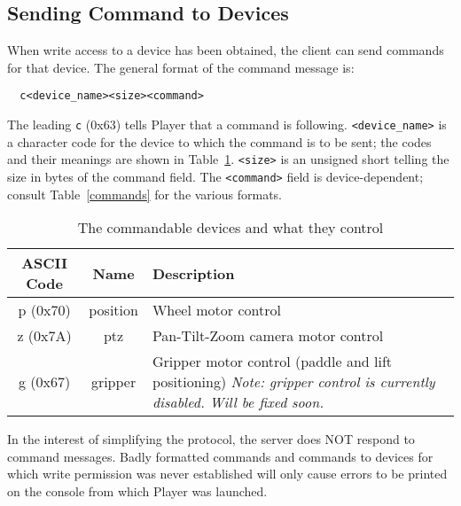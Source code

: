 \documentclass[11pt]{article}
\begin{document}
\subsection{Sending Command to Devices}

When write access to a device has been obtained, the client can send
commands for that device.  The general format of the command message is:

\begin{verbatim}
  c<device_name><size><command>
\end{verbatim}

The leading {\tt c} (0x63) tells Player that a command is following. 
{\tt <device\_name>} is a character code for the device 
to which the command is to be sent;
the codes and their meanings are shown in Table~\ref{command_intro}. 
{\tt <size>} is an unsigned
short telling the size in bytes of
the command field. The {\tt <command>} field is device-dependent; 
consult Table~\ref{commands} for the various formats.

\begin{table}
\begin{center}
\begin{tabularx}{\columnwidth}{|c|c|X|}
\hline
ASCII Code & Name & Description \\
\hline
p (0x70) & position & Wheel motor control \\
\hline
z (0x7A) & ptz & Pan-Tilt-Zoom camera motor control \\
\hline
g (0x67) & gripper & Gripper motor control (paddle and lift positioning) 
{\sl Note: gripper control is currently disabled.  Will be fixed soon.}\\
\hline
\end{tabularx}
\end{center}
\caption{The commandable devices and what they control}
\label{command_intro}
\end{table}

In the interest of simplifying the protocol, the server does NOT 
respond to command messages.  Badly formatted commands and commands
to devices for which write permission was never established will only
cause errors to be printed on the console from which Player was launched.
\end{document}
